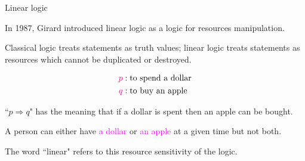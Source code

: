 \documentclass[aspectratio=169]{beamer}
\begin{document}
\iffalse

\begin{frame}{Linear logic}

In 1987, Girard introduced linear logic as a logic for resources manipulation.

\vspace{0.5em}

Classical logic treats statements as truth values; linear logic treats statements as resources which cannot be duplicated or destroyed.

\vspace{-1em}

\begin{align*}
    \textcolor{magenta}{p} &:  \text{to spend a dollar} \\
    \textcolor{magenta}{q} &: \text{to buy an apple} 
\end{align*}

``$p \Rightarrow q$" has the meaning that if a dollar is spent then an apple 
can be bought. 

\vspace{0.5em}

A person can either have \textcolor{magenta}{a dollar} or \textcolor{magenta}{an apple} at a given time but not both. 

\vspace{0.5em}
    
    The word ``linear" refers to this resource sensitivity of the 
    logic.
\end{frame}
\end{document}

